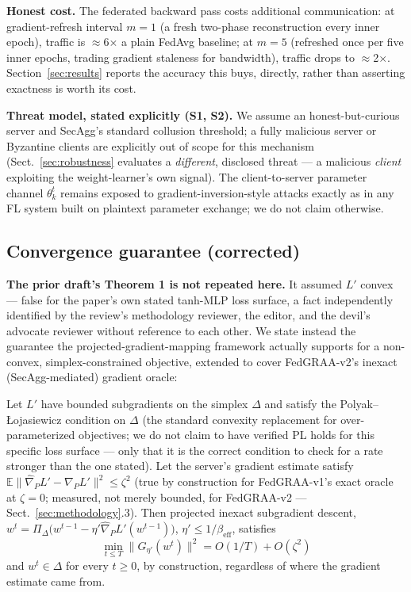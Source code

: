\documentclass{llncs}
\begin{document}
\textbf{Honest cost.} The federated backward pass costs additional communication: at gradient-refresh interval $m=1$ (a fresh two-phase reconstruction every inner epoch), traffic is $\approx$6$\times$ a plain FedAvg baseline; at $m=5$ (refreshed once per five inner epochs, trading gradient staleness for bandwidth), traffic drops to $\approx$2$\times$. Section~\ref{sec:results} reports the accuracy this buys, directly, rather than asserting exactness is worth its cost.

\textbf{Threat model, stated explicitly (S1, S2).} We assume an honest-but-curious server and SecAgg's standard collusion threshold; a fully malicious server or Byzantine clients are explicitly out of scope for this mechanism (Sect.~\ref{sec:robustness} evaluates a \emph{different}, disclosed threat --- a malicious \emph{client} exploiting the weight-learner's own signal). The client-to-server parameter channel $\theta_k^t$ remains exposed to gradient-inversion-style attacks exactly as in any FL system built on plaintext parameter exchange; we do not claim otherwise.

\subsection{Convergence guarantee (corrected)}

\textbf{The prior draft's Theorem 1 is not repeated here.} It assumed $L'$ convex --- false for the paper's own stated tanh-MLP loss surface, a fact independently identified by the review's methodology reviewer, the editor, and the devil's advocate reviewer without reference to each other. We state instead the guarantee the projected-gradient-mapping framework actually supports for a non-convex, simplex-constrained objective, extended to cover FedGRAA-v2's inexact (SecAgg-mediated) gradient oracle:

\begin{theorem}
Let $L'$ have bounded subgradients on the simplex $\Delta$ and satisfy the Polyak--{\L}ojasiewicz condition on $\Delta$ (the standard convexity replacement for over-parameterized objectives; we do not claim to have verified PL holds for this specific loss surface --- only that it is the correct condition to check for a rate stronger than the one stated). Let the server's gradient estimate satisfy $\mathbb{E}\|\hat\nabla_P L' - \nabla_P L'\|^2 \le \zeta^2$ (true by construction for FedGRAA-v1's exact oracle at $\zeta=0$; measured, not merely bounded, for FedGRAA-v2 --- Sect.~\ref{sec:methodology}.3). Then projected inexact subgradient descent, $w^t = \Pi_\Delta\big(w^{t-1} - \eta' \hat\nabla_P L'(w^{t-1})\big)$, $\eta' \le 1/\beta_{\text{eff}}$, satisfies
\begin{equation}
\min_{t \le T} \|G_{\eta'}(w^t)\|^2 = O(1/T) + O(\zeta^2)
\label{eq:convergence}
\end{equation}
and $w^t \in \Delta$ for every $t \ge 0$, by construction, regardless of where the gradient estimate came from.
\end{theorem}
\end{document}
